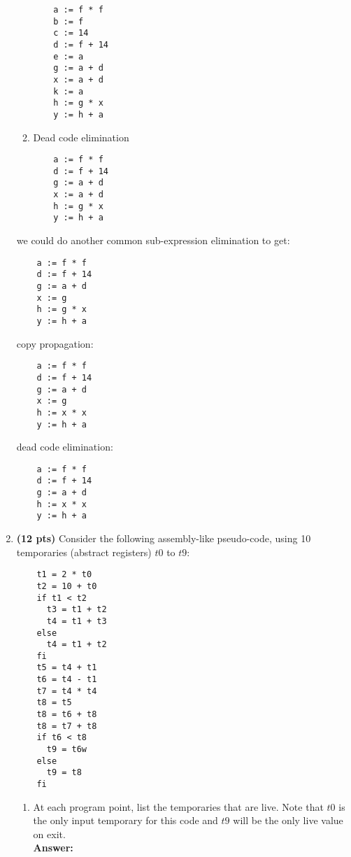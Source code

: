 \documentclass[11pt]{article}
\begin{document}
\begin{enumerate}
\begin{enumerate}
	\begin{lstlisting}
    a := f * f
    b := f
    c := 14
    d := f + 14
    e := a
    g := a + d
    x := a + d
    k := a
    h := g * x
    y := h + a
  \end{lstlisting}
	
	
    \item Dead code elimination
	
	\begin{lstlisting}
    a := f * f
    d := f + 14
    g := a + d
    x := a + d
    h := g * x
    y := h + a
  \end{lstlisting}
		
   
  \end{enumerate}
  
  we could do another common sub-expression elimination to get:

  	\begin{lstlisting}
    a := f * f
    d := f + 14
    g := a + d
    x := g
    h := g * x
    y := h + a
  \end{lstlisting}
  
  copy propagation:
   \begin{lstlisting}
    a := f * f
    d := f + 14
    g := a + d
    x := g
    h := x * x
    y := h + a
  \end{lstlisting}
  
  dead code elimination:
  
    \begin{lstlisting}
    a := f * f
    d := f + 14
    g := a + d
    h := x * x
    y := h + a
  \end{lstlisting}
  
  
   \newpage
  
  
  \item \textbf{(12 pts)} Consider the following assembly-like pseudo-code, using 10 temporaries (abstract registers) $t0$ to $t9$: \\
  
  \begin{lstlisting}
    t1 = 2 * t0
    t2 = 10 + t0
    if t1 < t2
      t3 = t1 + t2
      t4 = t1 + t3
    else
      t4 = t1 + t2
    fi
    t5 = t4 + t1
    t6 = t4 - t1
    t7 = t4 * t4
    t8 = t5
    t8 = t6 + t8
    t8 = t7 + t8
    if t6 < t8
      t9 = t6w
    else
      t9 = t8
    fi
  \end{lstlisting}
  \begin{enumerate}
    \item At each program point, list the temporaries that are live. Note that $t0$ is the only input temporary for this code and $t9$ will be the only live value on exit.\\
    \textbf{Answer:} 
    

\end{enumerate}
\end{enumerate}
\end{document}
